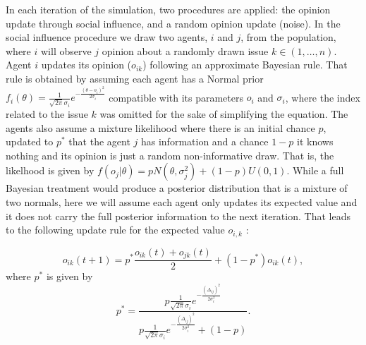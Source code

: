 \documentclass{article}
\begin{document}
In each iteration of the simulation, two procedures are applied: the
opinion update through social influence, and a random opinion update (noise). In
the social influence procedure we draw two agents, \(i\) and \(j\), from the
population, where \(i\) will observe \(j\) opinion about a randomly drawn issue \(k
\in (1 , \ldots, n)\). %
Agent \(i\) updates its opinion (\(o_{ik}\)) following an approximate Bayesian
rule. That rule is obtained by assuming each agent has a Normal prior
\(f_i(\theta) = \frac{1}{\sqrt{2 \pi} \sigma_i} e^{- \frac{(\theta - o_i )^2}{2
    \sigma_i}} \) compatible with its parameters $o_{i}$ and $\sigma_{i}$, where
the index related to the issue $k$ was omitted for the sake of simplifying the
equation. The agents also assume a mixture likelihood where there is an initial
chance \(p\), updated to \(p^*\) that the agent \(j\) has information and a
chance \(1-p\) it knows nothing and its opinion is just a random non-informative
draw. That is, the likelhood is given by \( f(o_j|\theta) = p
N(\theta,\sigma_j^2) + (1-p)U(0,1) \). While a full Bayesian treatment would
produce a posterior distribution that is a mixture of two normals, here we will
assume each agent only updates its expected value and it does not carry the full
posterior information to the next iteration. That leads to the following update
rule for the expected value $o_{i,k}$ \cite{martins2009bayesian}:


  \begin{equation}\label{eq:oupdate}
    o_{ik}(t+1) =
    p^{*}
    \frac{o_{ik}(t) + o_{jk}(t) }{2}
    +
    (1 - p^{*})
    o_{ik}(t),
  \end{equation}
where  $p^{*}$ is given by
  \begin{equation}\label{eq:pstar}
   p^{*}
    =
  \frac{
      p \frac{1}{\sqrt{2 \pi} \sigma_i}
      e^{- \frac{ (\Delta_{ij})^2}{2 \sigma_i^2}}
    }{
      p
      \frac{1}{\sqrt{2 \pi} \sigma_i}
    e^{- \frac{ ( \Delta_{ij})^2}{2 \sigma_i^2}}
    +
    (1 - p)
  }.
\end{equation}
\end{document}
